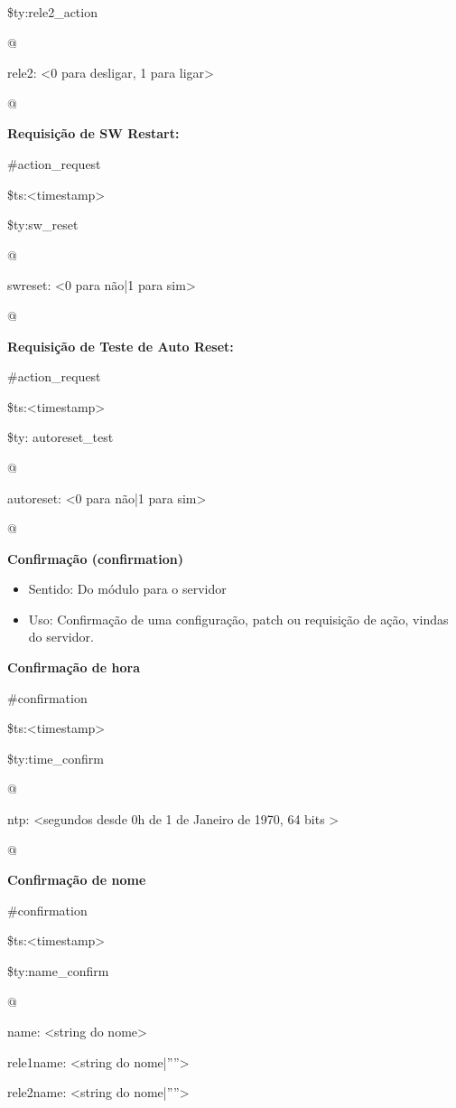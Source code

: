 \$ty:rele2\_action

@

rele2: \textless 0 para desligar, 1 para ligar\textgreater

@

\textbf{Requisição de SW Restart:}

\#action\_request

\$ts:\textless timestamp\textgreater

\$ty:sw\_reset

@

swreset: \textless 0 para não|1 para sim\textgreater

@

\textbf{Requisição de Teste de Auto Reset:}

\#action\_request

\$ts:\textless timestamp\textgreater

\$ty: autoreset\_test

@

autoreset: \textless 0 para não|1 para sim\textgreater

@

\textbf{Confirmação (confirmation)}
\begin{itemize}
\item Sentido: Do módulo para o servidor
\item Uso: Confirmação de uma configuração, patch ou requisição de ação, vindas do servidor.
\end{itemize}

\textbf{Confirmação de hora}

\#confirmation

\$ts:\textless timestamp\textgreater

\$ty:time\_confirm

@

ntp: \textless segundos desde 0h de 1 de Janeiro de 1970, 64 bits \textgreater

@

\textbf{Confirmação de nome}

\#confirmation

\$ts:\textless timestamp\textgreater

\$ty:name\_confirm

@

name: \textless string do nome\textgreater

rele1name: \textless string do nome|””\textgreater

rele2name: \textless string do nome|””\textgreater


